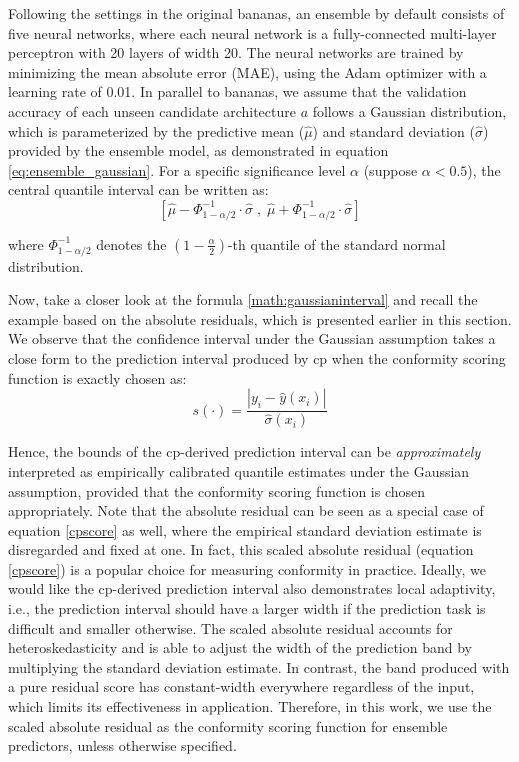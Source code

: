 \documentclass[a4paper,oneside,bibliography=totoc]{scrbook}
\begin{document}
{\begin{description}[leftmargin=0cm]
	\item [Ensemble Predictor] Following the settings in the original \gls{bananas}, an ensemble by default consists of five neural networks, where each neural network is a fully-connected multi-layer perceptron with 20 layers of width 20. The neural networks are trained by minimizing the mean absolute error (MAE), using the Adam optimizer with a learning rate of 0.01. In parallel to \gls{bananas}, we assume that the validation accuracy of each unseen candidate architecture $a$ follows a Gaussian distribution, which is parameterized by the predictive mean ($\hat{\mu}$) and standard deviation ($\hat{\sigma}$) provided by the ensemble model, as demonstrated in equation \ref{eq:ensemble_gaussian}. For a specific significance level $\alpha$ (suppose $\alpha<0.5$), the central quantile interval can be written as:
		\begin{equation}	
	\left[	
		\hat{\mu} - \Phi^{-1}_{1 - \alpha/2} \cdot \hat{\sigma}	\; ,\; 
		\hat{\mu} + \Phi^{-1}_{1 - \alpha/2} \cdot \hat{\sigma}
			\right]
		\label{math:gaussianinterval}
		\end{equation}
		
	where $\Phi^{-1}_{1 - \alpha/2}$ denotes the $(1-\frac{\alpha}{2})$-th quantile of the standard normal distribution. 
	
	Now, take a closer look at the formula \ref{math:gaussianinterval} and recall the example based on the absolute residuals, which is presented earlier in this section. We observe that the confidence interval under the Gaussian assumption takes a close form to the prediction interval produced by \gls{cp} when the conformity scoring function is exactly chosen as:
		\begin{equation}
			s(\cdot) = \frac{|y_i - \hat{y}(x_i)|}{\hat\sigma(x_i)}
		\label{cpscore}
		\end{equation}
	
	Hence, the bounds of the \gls{cp}-derived prediction interval can be \textit{approximately} interpreted as empirically calibrated quantile estimates under the Gaussian assumption, provided that the conformity scoring function is chosen appropriately. Note that the absolute residual can be seen as a special case of equation \ref{cpscore} as well, where the empirical standard deviation estimate is disregarded and fixed at one. In fact, this scaled absolute residual (equation \ref{cpscore}) is a popular choice for measuring conformity in practice. Ideally, we would like the \gls{cp}-derived prediction interval also demonstrates local adaptivity, i.e., the prediction interval should have a larger width if the prediction task is difficult and smaller otherwise. The scaled absolute residual accounts for heteroskedasticity and is able to adjust the width of the prediction band by multiplying the standard deviation estimate. In contrast, the band produced with a pure residual score has constant-width everywhere regardless of the input, which limits its effectiveness in application. Therefore, in this work, we use the scaled absolute residual as the conformity scoring function for ensemble predictors, unless otherwise specified.
	

\end{description}}
\end{document}

